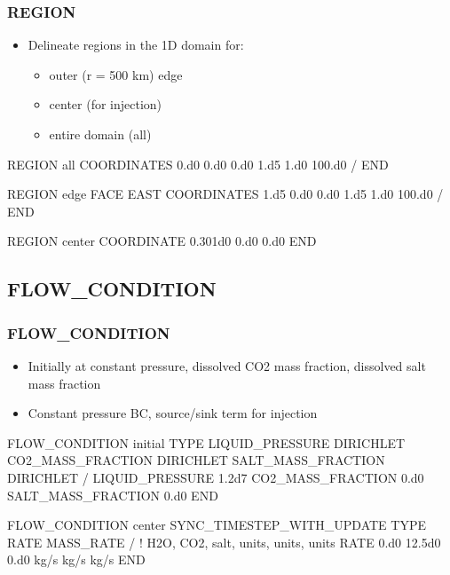 \documentclass{beamer}
\newcommand\bluecomment[1]{{{\color{blue} #1}}}
\begin{document}
\begin{frame}\frametitle{REGION}

\begin{itemize}
  \item Delineate regions in the 1D domain for:
  \begin{itemize}
    \item outer (r = 500 km) edge
    \item center (for injection)
    \item entire domain (all)
  \end{itemize}
\end{itemize}

\begin{semiverbatim}
REGION all
  COORDINATES
    0.d0 0.d0 0.d0
    1.d5 1.d0 100.d0
  /
END

\newpage
REGION edge
  FACE EAST
  COORDINATES
    1.d5 0.d0  0.d0
    1.d5 1.d0  100.d0
  /
END

REGION center
  COORDINATE 0.301d0 0.d0 0.d0
END
\end{semiverbatim}

\end{frame}

\subsection{FLOW\_CONDITION}

\begin{frame}\frametitle{FLOW\_CONDITION}

\begin{itemize}
\item Initially at constant pressure, dissolved CO2 mass fraction, dissolved salt mass fraction
\item Constant pressure BC, source/sink term for injection
\end{itemize}

\begin{semiverbatim}
FLOW_CONDITION initial
  TYPE
    LIQUID_PRESSURE DIRICHLET
    CO2_MASS_FRACTION DIRICHLET
    SALT_MASS_FRACTION DIRICHLET
  /
  LIQUID_PRESSURE 1.2d7
  CO2_MASS_FRACTION 0.d0
  SALT_MASS_FRACTION 0.d0
END

\newpage
FLOW_CONDITION center
  SYNC_TIMESTEP_WITH_UPDATE
  TYPE
    RATE MASS_RATE
  /
  \bluecomment{   ! H2O,  CO2,  salt, units, units, units}
  RATE 0.d0 12.5d0 0.d0   kg/s   kg/s   kg/s
END

\end{semiverbatim}

\end{frame}
\end{document}

